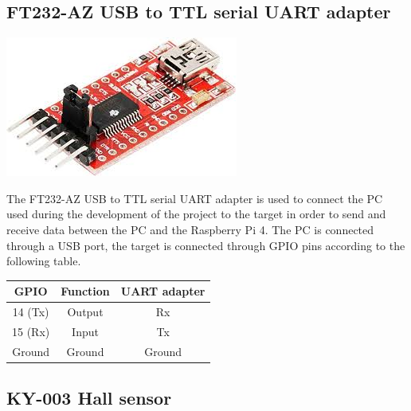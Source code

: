\documentclass[]{article}
\begin{document}
\subsection{FT232-AZ USB to TTL serial UART adapter}

\begin{center}
    \includegraphics[scale=0.4]{uart_adapter}
\end{center}
The FT232-AZ USB to TTL serial UART adapter is used to connect the PC used during the development of the project
to the target in order to send and receive data between the PC and the Raspberry Pi 4. 
The PC is connected through a USB port, the target is connected through GPIO pins according to the 
following table.

\begin{center}
    \begin{tabular}{ |c|c|c| } 
        \hline
        GPIO & Function & UART adapter  \\
        \hline
        14 (Tx) & Output & Rx \\ 
        15 (Rx) & Input & Tx \\ 
        Ground & Ground & Ground \\ 
        \hline
    \end{tabular}
\end{center}

\subsection{KY-003 Hall sensor}
\end{document}
